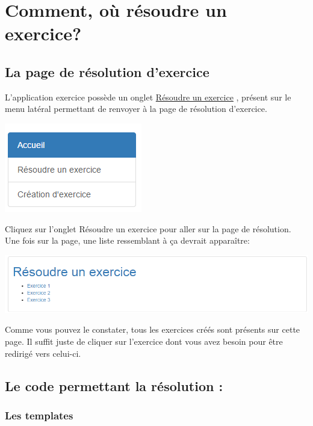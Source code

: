 \documentclass[letterpaper,10pt,english]{sphinxmanual}
\begin{document}
\chapter{Comment, où résoudre un exercice?}
\label{find:comment-ou-resoudre-un-exercice}\label{find::doc}

\section{La page de résolution d'exercice}
\label{find:la-page-de-resolution-d-exercice}
L'application exercice possède un onglet \href{https://webmath-thirteenfoil8.c9.io/exercises/find/}{Résoudre un exercice} , présent sur le menu latéral permettant de renvoyer à la page de
résolution d'exercice.

\includegraphics{onglet.png}

Cliquez sur l'onglet Résoudre un exercice pour aller sur la page de résolution. Une fois sur la page, une liste ressemblant à ça devrait apparaître:

\includegraphics{find.png}

Comme vous pouvez le constater, tous les exercices créés sont présents sur cette page. Il suffit juste de cliquer sur l'exercice dont vous avez besoin pour être redirigé vers celui-ci.


\section{Le code permettant la résolution :}
\label{find:le-code-permettant-la-resolution}

\subsection{Les templates}
\label{find:les-templates}
\end{document}
